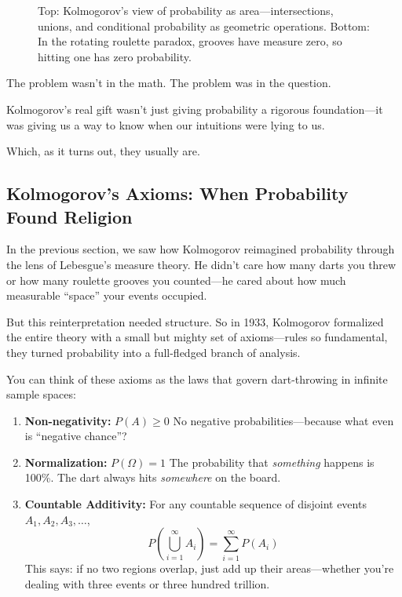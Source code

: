 \begin{figure}[H]
\caption{Top: Kolmogorov’s view of probability as area—intersections, unions, and conditional probability as geometric operations. Bottom: In the rotating roulette paradox, grooves have measure zero, so hitting one has zero probability.}
\end{figure}




The problem wasn’t in the math. The problem was in the question.

Kolmogorov’s real gift wasn’t just giving probability a rigorous foundation—it was giving us a way to know when our intuitions were lying to us.

Which, as it turns out, they usually are.


\subsection{Kolmogorov’s Axioms: When Probability Found Religion}

In the previous section, we saw how Kolmogorov reimagined probability through the lens of Lebesgue’s measure theory. He didn’t care how many darts you threw or how many roulette grooves you counted—he cared about how much measurable “space” your events occupied.

But this reinterpretation needed structure. So in 1933, Kolmogorov formalized the entire theory with a small but mighty set of axioms—rules so fundamental, they turned probability into a full-fledged branch of analysis.

You can think of these axioms as the laws that govern dart-throwing in infinite sample spaces:

\begin{enumerate}
    \item \textbf{Non-negativity:} \( P(A) \geq 0 \)  
    No negative probabilities—because what even is “negative chance”?

    \item \textbf{Normalization:} \( P(\Omega) = 1 \)  
    The probability that \emph{something} happens is 100\%. The dart always hits \emph{somewhere} on the board.

    \item \textbf{Countable Additivity:}  
    For any countable sequence of disjoint events \( A_1, A_2, A_3, \dots \),
    \[
    P\left(\bigcup_{i=1}^{\infty} A_i\right) = \sum_{i=1}^{\infty} P(A_i)
    \]
    This says: if no two regions overlap, just add up their areas—whether you’re dealing with three events or three hundred trillion.
\end{enumerate}




